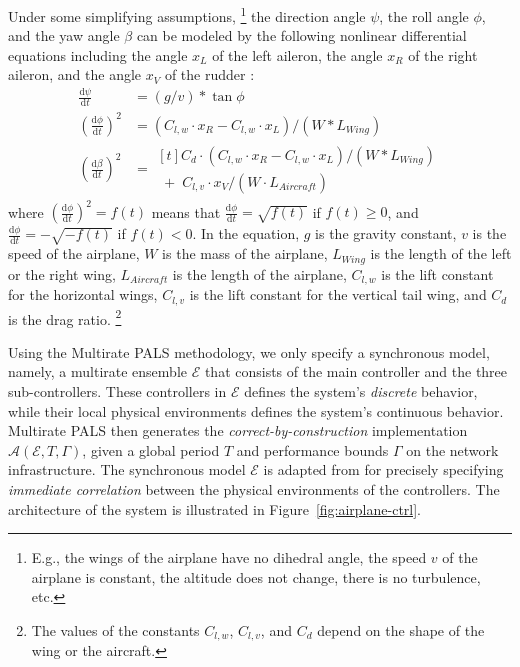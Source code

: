 \documentclass{sig-alternate}
\begin{document}
Under some simplifying assumptions,%
\footnote{E.g., the wings of the airplane have no dihedral angle, 
the speed $v$ of the airplane is constant, 
the altitude does not change, there is no turbulence, etc.}
the direction angle $\psi$, the roll angle $\phi$, and the yaw angle $\beta$
can be modeled by the following nonlinear differential equations 
including 
the angle $x_L$ of the left aileron,
the angle $x_R$ of the right aileron, and 
the angle $x_V$ of the rudder
\cite{ftscs-journal}:
%
\begin{align}
\frac{\mathrm{d}\psi}{\mathrm{d}t} &= (g / v) * \tan \phi
\label{eq:dir}
\\
(\frac{\mathrm{d}\phi}{\mathrm{d}t})^2 &=
(C_{l,w} \cdot x_R - C_{l,w} \cdot x_L) / (W * L_{\mathit{Wing}})
\label{eq:roll}
\\
(\frac{\mathrm{d}\beta}{\mathrm{d}t})^2 &=
\begin{multlined}[t]
C_d \cdot (C_{l,w} \cdot x_R - C_{l,w} \cdot x_L) / (W * L_{\mathit{Wing}})
\\
 \;+\; C_{l,v} \cdot x_V / (W \cdot L_{\mathit{Aircraft}})
\end{multlined}
 \label{eq:yaw}
\end{align}
%
where $(\frac{\mathrm{d}\phi}{\mathrm{d}t})^2 = f(t)$
means that 
$\frac{\mathrm{d}\phi}{\mathrm{d}t} = \sqrt{f(t)}$ if $f(t) \geq 0$,
and
$\frac{\mathrm{d}\phi}{\mathrm{d}t} = - \sqrt{- f(t)}$ if $f(t) < 0$.
In the equation, $g$ is the gravity constant, $v$ is the speed of the airplane,
$W$ is the mass of the airplane, 
 $L_{\mathit{Wing}}$ is the length of the left or the right wing,
 $L_{\mathit{Aircraft}}$ is the length of the airplane,
 $C_{l,w}$ is the lift constant for the horizontal wings,
 $C_{l,v}$ is the lift constant for the vertical tail wing,
 and  $C_d$ is the drag ratio.%
 \footnote{The values of the constants  $C_{l,w}$,  $C_{l,v}$, and $C_d$
 depend on the shape of the wing or the aircraft.}

 




Using the Multirate PALS methodology,
we only specify  a synchronous model,
namely,  a multirate ensemble $\mathcal{E}$ that consists of 
the main controller and the three sub-controllers.
These controllers in $\mathcal{E}$ defines 
the system's \emph{discrete} behavior,
while their local physical environments
defines the system's continuous behavior.
%
Multirate PALS then generates
the \emph{correct-by-construction}   
implementation  
$\mathcal{A}(\mathcal{E}, T, \Gamma)$,
given a global period $T$ and performance bounds 
$\Gamma$ on the network infrastructure.
%
The synchronous model $\mathcal{E}$ %
is adapted from \cite{ftscs-journal} 
for precisely specifying \emph{immediate correlation}
between the physical environments of the controllers.
%
The architecture of the system is illustrated in Figure~\ref{fig:airplane-ctrl}.
\end{document}
